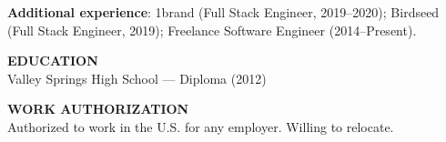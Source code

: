 \documentclass[10pt]{article}
\begin{document}
\textbf{Additional experience}: 1brand (Full Stack Engineer, 2019--2020); Birdseed (Full Stack Engineer, 2019); Freelance Software Engineer (2014--Present).

\vspace{4pt}
\textbf{EDUCATION}\\
Valley Springs High School --- Diploma (2012)

\vspace{2pt}
\textbf{WORK AUTHORIZATION}\\
Authorized to work in the U.S. for any employer. Willing to relocate.
\end{document}
